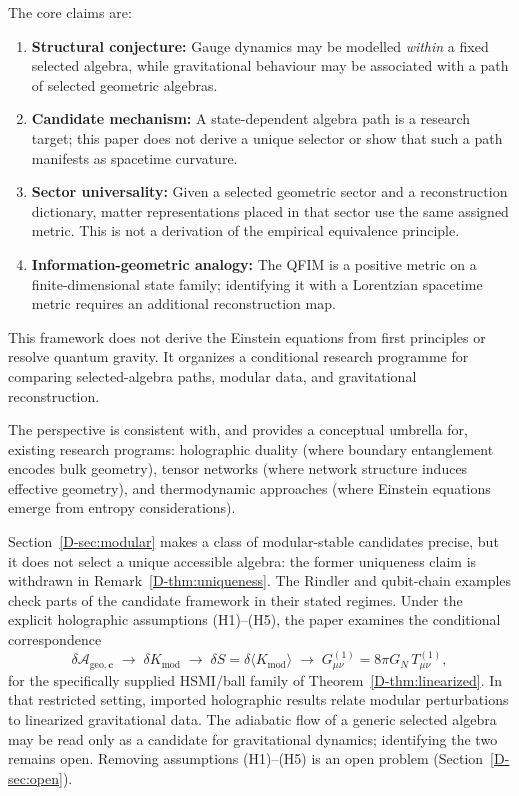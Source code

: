 \documentclass[12pt,a4paper,openany]{book}
\begin{document}
The core claims are:
\begin{enumerate}
    \item \textbf{Structural conjecture:} Gauge dynamics may be modelled \emph{within} a fixed selected algebra, while gravitational behaviour may be associated with a path of selected geometric algebras.
    
    \item \textbf{Candidate mechanism:} A state-dependent algebra path is a research target; this paper does not derive a unique selector or show that such a path manifests as spacetime curvature.
    
    \item \textbf{Sector universality:} Given a selected geometric sector and a reconstruction dictionary, matter representations placed in that sector use the same assigned metric. This is not a derivation of the empirical equivalence principle.
    
    \item \textbf{Information-geometric analogy:} The QFIM is a positive metric on a finite-dimensional state family; identifying it with a Lorentzian spacetime metric requires an additional reconstruction map.
\end{enumerate}

This framework does not derive the Einstein equations from first principles or resolve quantum gravity. It organizes a conditional research programme for comparing selected-algebra paths, modular data, and gravitational reconstruction.

The perspective is consistent with, and provides a conceptual umbrella for, existing research programs: holographic duality (where boundary entanglement encodes bulk geometry), tensor networks (where network structure induces effective geometry), and thermodynamic approaches (where Einstein equations emerge from entropy considerations).

Section~\ref{D-sec:modular} makes a class of modular-stable candidates precise, but it does not select a unique accessible algebra: the former uniqueness claim is withdrawn in Remark~\ref{D-thm:uniqueness}. The Rindler and qubit-chain examples check parts of the candidate framework in their stated regimes. Under the explicit holographic assumptions (H1)--(H5), the paper examines the conditional correspondence
\begin{equation}
\delta\mathcal{A}_{\mathrm{geo},\mathbf{c}} \;\longrightarrow\; \delta K_{\mathrm{mod}} \;\longrightarrow\; \delta S = \delta\langle K_{\mathrm{mod}}\rangle \;\longrightarrow\; G_{\mu\nu}^{(1)} = 8\pi G_N\, T_{\mu\nu}^{(1)},
\end{equation}
for the specifically supplied HSMI/ball family of Theorem~\ref{D-thm:linearized}. In that restricted setting, imported holographic results relate modular perturbations to linearized gravitational data. The adiabatic flow of a generic selected algebra may be read only as a candidate for gravitational dynamics; identifying the two remains open. Removing assumptions (H1)--(H5) is an open problem (Section~\ref{D-sec:open}).
\end{document}
